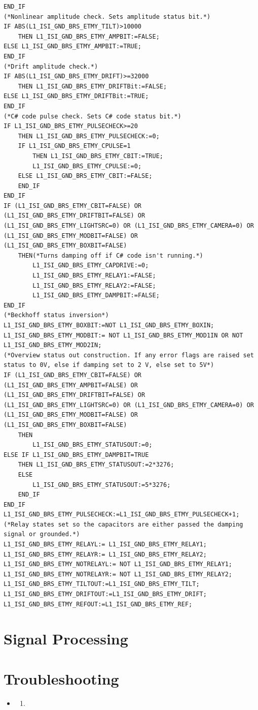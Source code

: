 \documentclass{article}
\begin{document}
\begin{lstlisting}
END_IF
(*Nonlinear amplitude check. Sets amplitude status bit.*)
IF ABS(L1_ISI_GND_BRS_ETMY_TILT)>10000
	THEN L1_ISI_GND_BRS_ETMY_AMPBIT:=FALSE;
ELSE L1_ISI_GND_BRS_ETMY_AMPBIT:=TRUE;
END_IF
(*Drift amplitude check.*)
IF ABS(L1_ISI_GND_BRS_ETMY_DRIFT)>=32000
	THEN L1_ISI_GND_BRS_ETMY_DRIFTBit:=FALSE;
ELSE L1_ISI_GND_BRS_ETMY_DRIFTBit:=TRUE;
END_IF
(*C# code pulse check. Sets C# code status bit.*)
IF L1_ISI_GND_BRS_ETMY_PULSECHECK>=20
	THEN L1_ISI_GND_BRS_ETMY_PULSECHECK:=0;
	IF L1_ISI_GND_BRS_ETMY_CPULSE=1
		THEN L1_ISI_GND_BRS_ETMY_CBIT:=TRUE;
		L1_ISI_GND_BRS_ETMY_CPULSE:=0;		
	ELSE L1_ISI_GND_BRS_ETMY_CBIT:=FALSE;		
	END_IF
END_IF
IF (L1_ISI_GND_BRS_ETMY_CBIT=FALSE) OR (L1_ISI_GND_BRS_ETMY_DRIFTBIT=FALSE) OR (L1_ISI_GND_BRS_ETMY_LIGHTSRC=0) OR (L1_ISI_GND_BRS_ETMY_CAMERA=0) OR (L1_ISI_GND_BRS_ETMY_MODBIT=FALSE) OR (L1_ISI_GND_BRS_ETMY_BOXBIT=FALSE)
	THEN(*Turns damping off if C# code isn't running.*)
		L1_ISI_GND_BRS_ETMY_CAPDRIVE:=0;
		L1_ISI_GND_BRS_ETMY_RELAY1:=FALSE;
		L1_ISI_GND_BRS_ETMY_RELAY2:=FALSE;
		L1_ISI_GND_BRS_ETMY_DAMPBIT:=FALSE;
END_IF
(*Beckhoff status inversion*)
L1_ISI_GND_BRS_ETMY_BOXBIT:=NOT L1_ISI_GND_BRS_ETMY_BOXIN;
L1_ISI_GND_BRS_ETMY_MODBIT:= NOT L1_ISI_GND_BRS_ETMY_MOD1IN OR NOT L1_ISI_GND_BRS_ETMY_MOD2IN;
(*Overview status out construction. If any error flags are raised set status to 0V, else if damping set to 2 V, else set to 5V*)
IF (L1_ISI_GND_BRS_ETMY_CBIT=FALSE) OR (L1_ISI_GND_BRS_ETMY_AMPBIT=FALSE) OR (L1_ISI_GND_BRS_ETMY_DRIFTBIT=FALSE) OR (L1_ISI_GND_BRS_ETMY_LIGHTSRC=0) OR (L1_ISI_GND_BRS_ETMY_CAMERA=0) OR (L1_ISI_GND_BRS_ETMY_MODBIT=FALSE) OR (L1_ISI_GND_BRS_ETMY_BOXBIT=FALSE)
	THEN 
		L1_ISI_GND_BRS_ETMY_STATUSOUT:=0;
ELSE IF L1_ISI_GND_BRS_ETMY_DAMPBIT=TRUE
	THEN L1_ISI_GND_BRS_ETMY_STATUSOUT:=2*3276;
	ELSE
		L1_ISI_GND_BRS_ETMY_STATUSOUT:=5*3276;
	END_IF
END_IF
L1_ISI_GND_BRS_ETMY_PULSECHECK:=L1_ISI_GND_BRS_ETMY_PULSECHECK+1;
(*Relay states set so the capacitors are either passed the damping signal or grounded.*)
L1_ISI_GND_BRS_ETMY_RELAYL:= L1_ISI_GND_BRS_ETMY_RELAY1;
L1_ISI_GND_BRS_ETMY_RELAYR:= L1_ISI_GND_BRS_ETMY_RELAY2;
L1_ISI_GND_BRS_ETMY_NOTRELAYL:= NOT L1_ISI_GND_BRS_ETMY_RELAY1;
L1_ISI_GND_BRS_ETMY_NOTRELAYR:= NOT L1_ISI_GND_BRS_ETMY_RELAY2;
L1_ISI_GND_BRS_ETMY_TILTOUT:=L1_ISI_GND_BRS_ETMY_TILT;
L1_ISI_GND_BRS_ETMY_DRIFTOUT:=L1_ISI_GND_BRS_ETMY_DRIFT;
L1_ISI_GND_BRS_ETMY_REFOUT:=L1_ISI_GND_BRS_ETMY_REF;
\end{lstlisting}
\section{Signal Processing}

\section{Troubleshooting}
\begin{itemize}
\item 
\begin{enumerate}
\item
\end{enumerate}
\end{itemize}
\end{document}
